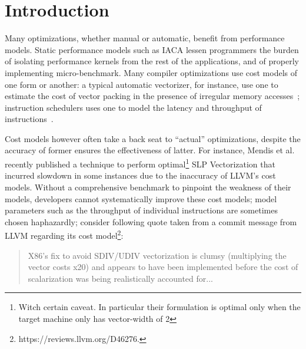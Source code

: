 \section{Introduction}
Many optimizations, whether manual or automatic,
benefit from performance models.
Static performance models such as IACA lessen programmers
the burden of isolating performance kernels from
the rest of the applications,
and of properly implementing micro-benchmark. Many compiler optimizations
use cost models of one form or another:
a typical automatic vectorizer, for instance,
use one to estimate the cost of vector packing
in the presence of irregular memory accesses~\cite{goslp};
instruction schedulers uses one to model the latency
and throughput of instructions~\cite{llvm-sched,gcc-sched}.

Cost models however often take a back seat to “actual” optimizations,
despite the accuracy of former ensures the effectiveness of latter.
For instance, Mendis et al.\cite{goslp}
recently published a technique to perform optimal\footnote{
Witch certain caveat.
In particular their formulation is optimal
only when the target machine only has vector-width of 2}
SLP Vectorization\cite{slp} that
incurred slowdown in some instances due to the inaccuracy of 
LLVM's cost models.
Without a comprehensive benchmark to pinpoint the weakness of their models,
developers cannot systematically improve these cost models;
model parameters
such as the throughput of individual instructions
are sometimes chosen haphazardly;
consider following quote taken from a commit message from LLVM\cite{llvm}
regarding its cost model\footnote{
https://reviews.llvm.org/D46276.
}:
\begin{quote}
X86's fix to avoid SDIV/UDIV vectorization is clumsy
(multiplying the vector costs x20)
and appears to have been implemented before the cost of
scalarization was being realistically accounted for...
\end{quote}


